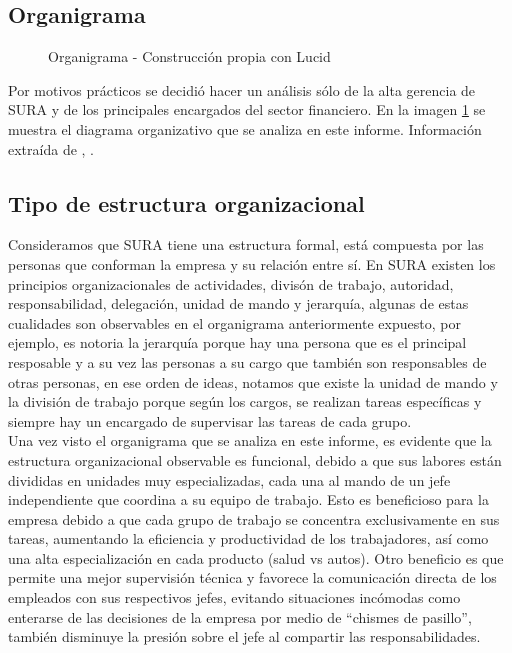 \documentclass[onecolumn]{article} %
\begin{document}
	\subsection{Organigrama}
	
	\begin{figure}[H]
		\centering
		
		\caption{Organigrama - Construcción propia con Lucid}
		\label{fig:Og}
	\end{figure}
	
	
	
	Por motivos prácticos se decidió hacer un análisis sólo de la alta gerencia de SURA y de los principales encargados del sector financiero. En la imagen \ref{fig:Og} se muestra el diagrama organizativo que se analiza en este informe. Información extraída de \cite{mp5}, \cite{mp6}. 
	
	\subsection{Tipo de estructura organizacional}
	
	Consideramos que SURA tiene una estructura formal, está compuesta por las personas que conforman la empresa y su relación entre sí. En SURA existen los principios organizacionales de actividades, divisón de trabajo, autoridad, responsabilidad, delegación, unidad de mando y jerarquía, algunas de estas cualidades son observables en el organigrama anteriormente expuesto, por ejemplo, es notoria la jerarquía porque hay una persona que es el principal resposable y a su vez las personas a su cargo que también son responsables de otras personas, en ese orden de ideas, notamos que existe la unidad de mando y la división de trabajo porque según los cargos, se realizan tareas específicas y siempre hay un encargado de supervisar las tareas de cada grupo. \\
	
	Una vez visto el organigrama que se analiza en este informe, es evidente que la estructura organizacional observable es funcional, debido a que sus labores están divididas en unidades muy especializadas, cada una al mando de un jefe independiente que coordina a su equipo de trabajo. Esto es beneficioso para la empresa debido a que cada grupo de trabajo se concentra exclusivamente en sus tareas, aumentando la eficiencia y productividad de los trabajadores, así como una alta especialización en cada producto (salud vs autos). Otro beneficio es que permite una mejor supervisión técnica y favorece la comunicación directa de los empleados con sus respectivos jefes, evitando situaciones incómodas como enterarse de las decisiones de la empresa por medio de ``chismes de pasillo'', también disminuye la presión sobre el jefe al compartir las responsabilidades. \\
	
\end{document}
